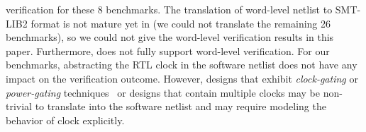 verification for these 8 benchmarks. The translation of word-level 
netlist to SMT-LIB2 format is not mature yet in \ebmc (we could not 
translate the remaining 26 benchmarks), so we could not give the 
word-level verification results in this paper. Furthermore, 
\ABC does not fully support word-level verification.  
%
For our benchmarks, abstracting the RTL clock in the software 
netlist does not have any impact on the verification outcome.   
However, designs that exhibit 
\emph{clock-gating} or \emph{power-gating} techniques~\cite{lowpower} 
or designs that contain multiple clocks may be non-trivial to translate 
into the software netlist and may require modeling the behavior of clock 
explicitly.  
%
